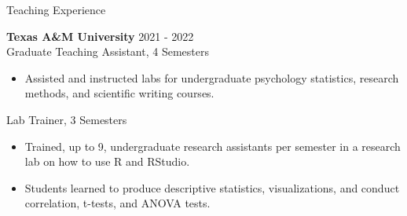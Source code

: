 \documentclass{resume} %
\begin{document}
\break

\begin{rSection}{Teaching Experience}
    
    {\bf {Texas A\&M University}}
    \hfill {2021 - 2022}
    \\Graduate Teaching Assistant, 4 Semesters
    
    \begin{itemize}[nosep]
        
        \item Assisted and instructed labs for undergraduate
        psychology statistics, research methods, and scientific
        writing courses.
        
    \end{itemize}

    Lab Trainer, 3 Semesters
    
    \begin{itemize}[nosep]
        
        \item Trained, up to 9, undergraduate research assistants per 
        semester in a research lab on how to use R and RStudio.
        \item Students learned to produce descriptive statistics, visualizations, and conduct correlation, t-tests, and ANOVA tests.
        
    \end{itemize}
    
\end{rSection}

%


\end{document}
